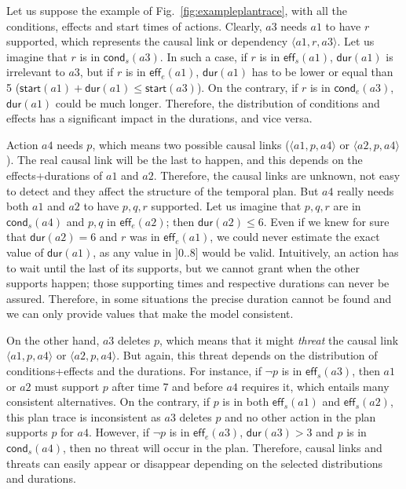 \documentclass[runningheads]{llncs}
\newcommand{\tup}[1]{{\langle #1 \rangle}}
\newcommand{\eff}{\mathsf{eff}}    %
\newcommand{\cond}{\mathsf{cond}}  %
\newcommand{\dur}{\mathsf{dur}}    %
\newcommand{\start}{\mathsf{start}}%
\begin{document}
Let us suppose the example of Fig.~\ref{fig:exampleplantrace}, with all the conditions, effects and start times of actions. Clearly, $a3$ needs $a1$ to have $r$ supported, which represents the causal link or dependency $\tup{a1,r,a3}$. Let us imagine that $r$ is in $\cond_s(a3)$. In such a case, if $r$ is in $\eff_s(a1)$, $\dur(a1)$ is irrelevant to $a3$, but if $r$ is in $\eff_e(a1)$, $\dur(a1)$ has to be lower or equal than 5 ($\start(a1)+\dur(a1) \leq \start(a3)$). On the contrary, if $r$ is in $\cond_e(a3)$, $\dur(a1)$ could be much longer. Therefore, the distribution of conditions and effects has a significant impact in the durations, and vice versa.

Action $a4$ needs $p$, which means two possible causal links ($\tup{a1,p,a4}$ or $\tup{a2,p,a4}$). The real causal link will be the last to happen, and this depends on the effects+durations of $a1$ and $a2$. Therefore, the causal links are unknown, not easy to detect and they affect the structure of the temporal plan. But $a4$ really needs both $a1$ and $a2$ to have $p,q,r$ supported. Let us imagine that $p,q,r$ are in $\cond_s(a4)$ and $p,q$ in $\eff_e(a2)$; then $\dur(a2) \leq 6$. Even if we knew for sure that $\dur(a2)=6$ and $r$ was in $\eff_e(a1)$, we could never estimate the exact value of $\dur(a1)$, as any value in $]0..8]$ would be valid. Intuitively, an action has to wait until the last of its supports, but we cannot grant when the other supports happen; those supporting times and respective durations can never be assured. Therefore, in some situations the precise duration cannot be found and we can only provide values that make the model consistent.

On the other hand, $a3$ deletes $p$, which means that it might \emph{threat} the causal link $\tup{a1,p,a4}$ or $\tup{a2,p,a4}$. But again, this threat depends on the distribution of conditions+effects and the durations. For instance, if $\neg p$ is in $\eff_s(a3)$, then $a1$ or $a2$ must support $p$ after time 7 and before $a4$ requires it, which entails many consistent alternatives. On the contrary, if $p$ is in both $\eff_s(a1)$ and $\eff_s(a2)$, this plan trace is inconsistent as $a3$ deletes $p$ and no other action in the plan supports $p$ for $a4$. However, if $\neg p$ is in $\eff_e(a3)$, $\dur(a3) > 3$ and $p$ is in $\cond_s(a4)$, then no threat will occur in the plan. Therefore, causal links and threats can easily appear or disappear depending on the selected distributions and durations.
\end{document}
